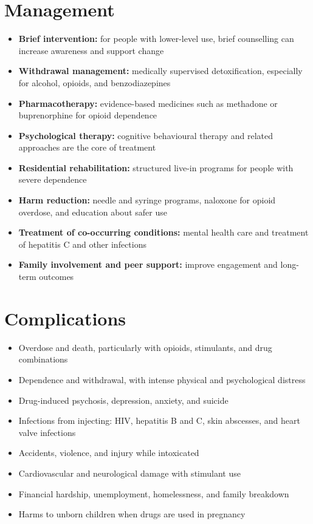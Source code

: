 \section*{Management}
\begin{itemize}
    \item \textbf{Brief intervention:} for people with lower-level use, brief counselling can increase awareness and support change
    \item \textbf{Withdrawal management:} medically supervised detoxification, especially for alcohol, opioids, and benzodiazepines
    \item \textbf{Pharmacotherapy:} evidence-based medicines such as methadone or buprenorphine for opioid dependence
    \item \textbf{Psychological therapy:} cognitive behavioural therapy and related approaches are the core of treatment
    \item \textbf{Residential rehabilitation:} structured live-in programs for people with severe dependence
    \item \textbf{Harm reduction:} needle and syringe programs, naloxone for opioid overdose, and education about safer use
    \item \textbf{Treatment of co-occurring conditions:} mental health care and treatment of hepatitis C and other infections
    \item \textbf{Family involvement and peer support:} improve engagement and long-term outcomes
\end{itemize}

\section*{Complications}
\begin{itemize}
    \item Overdose and death, particularly with opioids, stimulants, and drug combinations
    \item Dependence and withdrawal, with intense physical and psychological distress
    \item Drug-induced psychosis, depression, anxiety, and suicide
    \item Infections from injecting: HIV, hepatitis B and C, skin abscesses, and heart valve infections
    \item Accidents, violence, and injury while intoxicated
    \item Cardiovascular and neurological damage with stimulant use
    \item Financial hardship, unemployment, homelessness, and family breakdown
    \item Harms to unborn children when drugs are used in pregnancy
\end{itemize}

